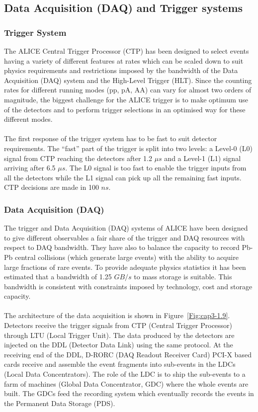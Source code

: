 \subsection{Data Acquisition (DAQ) and Trigger systems }
\label{par:3.2b}

\subsubsection*{Trigger System}
The ALICE Central Trigger Processor (CTP) has been designed to select events having a variety of different features at rates which can be scaled down to suit physics requirements and restrictions imposed by the bandwidth of the Data Acquisition (DAQ) system and the High-Level Trigger (HLT). Since the counting rates for different running modes (pp, pA, AA) can vary for almost two orders of magnitude, the biggest challenge for the ALICE trigger is to make optimum use of the detectors and to perform trigger selections in an optimised way for these different modes.\\
\\
The first response of the trigger system has to be fast to suit detector requirements. The “fast” part of the trigger is split into two levels: a Level-0 (L0) signal from CTP reaching the detectors after 1.2 $\mu s$ and a Level-1 (L1) signal arriving after 6.5 $\mu s$. The L0 signal is too fast to enable the trigger inputs from all the detectors while the L1 signal can pick up all the remaining fast inputs. CTP decisions are made in 100 $ns$.


\subsubsection*{Data Acquisition (DAQ)}
The trigger and Data Acquisition (DAQ) systems of ALICE have been designed to give different observables a fair share of the trigger and DAQ resources with respect to DAQ bandwidth. They have also to balance the capacity to record Pb-Pb central collisions (which generate large events) with the ability to acquire large fractions of rare events. To provide adequate physics statistics it has been estimated that a bandwidth of 1.25 $GB/s$ to mass storage is suitable. This bandwidth is consistent with constraints imposed by technology, cost and storage capacity.\\
\\
The architecture of the data acquisition is shown in \mbox{Figure \ref{Fig:cap3-1.9}}. Detectors receive the trigger signals from CTP (Central Trigger Processor) through LTU (Local Trigger Unit). The data produced by the detectors are injected on the DDL (Detector Data Link) using the same protocol. At the receiving end of the DDL, D-RORC (DAQ Readout Receiver Card) PCI-X based cards receive and assemble the event fragments into sub-events in the LDCs (Local Data Concentrators). The role of the LDC is to ship the sub-events to a farm of machines (Global Data Concentrator, GDC) where the whole events are built. The GDCs feed the recording system which eventually records the events in the Permanent Data Storage (PDS).

